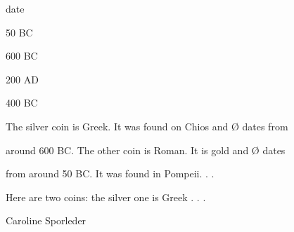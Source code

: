 \documentclass[compress,color=usenames]{beamer}
\begin{document}
\begin{frame}
date



50 BC



600 BC



200 AD



400 BC






The silver coin is Greek. It was found on Chios and {\O} dates from



around 600 BC. The other coin is Roman. It is gold and {\O} dates



from around 50 BC. It was found in Pompeii. . .



Here are two coins: the silver one is Greek . . .



Caroline Sporleder














\end{frame}
\end{document}
